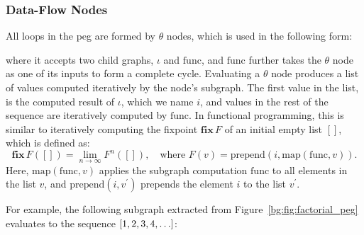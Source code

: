 \subsubsection{Data-Flow Nodes}

All loops in the \gls{peg} are formed by $\theta$ nodes, which is used in the
following form:
\begin{center}
    \vspace{-16.5pt}
    \vspace{-16.5pt}
\end{center}
where it accepts two child graphs, $\iota$ and $\mathrm{func}$, and
$\mathrm{func}$ further takes the $\theta$ node as one of its inputs to
form a complete cycle.  Evaluating a $\theta$ node produces a list of
values computed iteratively by the node's subgraph.  The first value in the
list, is the computed result of $\iota$, which we name $i$, and values in
the rest of the sequence are iteratively computed by $\mathrm{func}$.  In
functional programming, this is similar to iteratively computing the fixpoint
$\mathbf{fix}\,F$ of an initial empty list $[]$, which is defined as:
\begin{equation}
    \mathbf{fix}\,F ([]) = \lim_{n \to \infty} F^n ([]),
    \quad\text{where~}
    F(v) = \mathrm{prepend}\left(
        i, \mathrm{map}\left( \mathrm{func}, v \right)
    \right).
\end{equation}
Here, $\mathrm{map}(\mathrm{func}, v)$ applies the subgraph computation
$\mathrm{func}$ to all elements in the list $v$, and $\mathrm{prepend}(i,
v^\prime)$ prepends the element $i$ to the list $v^\prime$.

For example, the following subgraph extracted from
Figure~\ref{bg:fig:factorial_peg} evaluates to the sequence $[1, 2, 3, 4,
\mathellipsis]$:
\begin{center}
    \vspace{-16.5pt}
    \vspace{-16.5pt}
\end{center}

